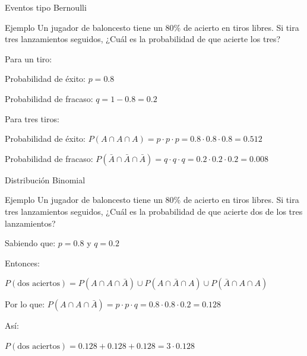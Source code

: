 \documentclass{beamer}
\begin{document}
\begin{frame}{Eventos tipo Bernoulli}

  \begin{block}{Ejemplo}
    Un jugador de baloncesto tiene un 80\% de acierto en tiros libres. Si tira tres
    lanzamientos seguidos, ¿Cuál es la probabilidad de que acierte los tres?
  \end{block}

  \begin{block}{}
    Para un tiro:

    Probabilidad de éxito: $p=0.8$

    Probabilidad de fracaso: $q = 1 - 0.8 = 0.2$
  \end{block}

  \begin{block}{}
    Para tres tiros:

    Probabilidad de éxito: $P(A \cap A \cap A) = p \cdot p \cdot p = 0.8 \cdot 0.8
    \cdot 0.8 = 0.512$

  \end{block}

  \begin{block}{}

    Probabilidad de fracaso: $P(\bar{A} \cap \bar{A} \cap \bar{A}) = q \cdot q \cdot q = 0.2 \cdot 0.2
    \cdot 0.2 = 0.008$

  \end{block}

\end{frame}

\begin{frame}{Distribución Binomial}
  \begin{block}{Ejemplo}
    Un jugador de baloncesto tiene un 80\% de acierto en tiros libres. Si tira tres
    lanzamientos seguidos, ¿Cuál es la probabilidad de que acierte dos de los tres
    lanzamientos?
  \end{block}

  \begin{block}{}
    Sabiendo que:    $p = 0.8$ y  $q = 0.2$

    Entonces:

$P(\text{dos aciertos}) = P(A \cap A \cap \bar{A}) 
                          \cup P(A \cap \bar{A} \cap A)
                          \cup P(\bar{A} \cap A \cap A )$
  \end{block}

  \begin{block}{}  
    Por lo que:
    $P(A \cap A \cap \bar{A}) = p \cdot p \cdot q 
                              = 0.8 \cdot 0.8 \cdot 0.2 
                              = 0.128$
  \end{block}

  \begin{block}{}
    Así:
    
    $P(\text{dos aciertos}) = 0.128 + 0.128 + 0.128 = 3 \cdot 0.128$
  \end{block}
\end{frame}
\end{document}
